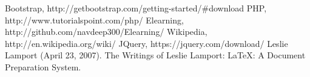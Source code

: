 \begin{thebibliography}{9}
\bibitem{} Bootstrap, http://getbootstrap.com/getting-started/\#download
\bibitem{} PHP, http://www.tutorialspoint.com/php/
\bibitem{} Elearning, http://github.com/navdeep300/Elearning/
\bibitem{} Wikipedia, http://en.wikipedia.org/wiki/
\bibitem{} JQuery, https://jquery.com/download/
\bibitem{} Leslie Lamport (April 23, 2007). The Writings of Leslie Lamport: LaTeX: A Document Preparation System.
\end{thebibliography}
